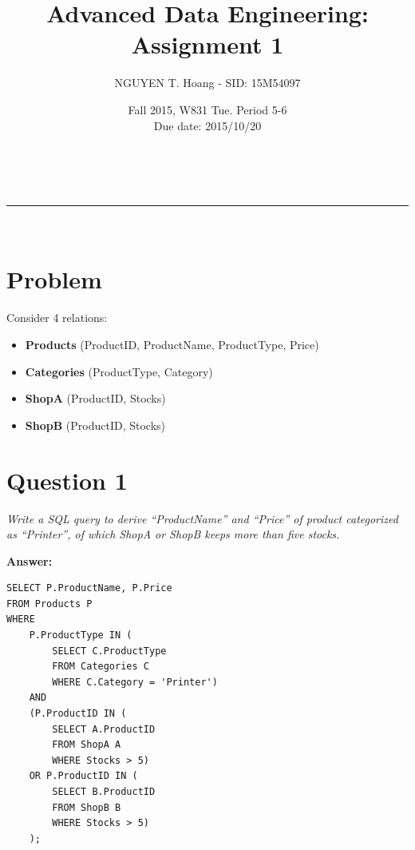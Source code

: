 \documentclass[a4paper,11pt]{article}
\makeatletter
\newcommand{\linia}{\rule{\linewidth}{0.5pt}}
\renewcommand{\maketitle}{
\begin{center}
\vspace{2ex}
{\huge \textsc{\@title}}
\vspace{1ex}
\\
\linia\\
\@author \hfill \@date
\vspace{4ex}
\end{center}
}
\makeatother
\begin{document}
\title{Advanced Data Engineering: Assignment 1}

\author{NGUYEN T. Hoang - SID: 15M54097}

\date{Fall 2015, W831 Tue. Period 5-6 \\ \hfill Due date: 2015/10/20}

\maketitle

\vfill

\section*{Problem}

Consider 4 relations:
\begin{itemize}
    \setlength{\itemsep}{0cm}
    \setlength{\parskip}{0cm}
    \item \textbf{Products} (ProductID, ProductName, ProductType, Price)
    \item \textbf{Categories} (ProductType, Category)
    \item \textbf{ShopA} (ProductID, Stocks)
    \item \textbf{ShopB} (ProductID, Stocks)
\end{itemize}
\vfill
\section*{Question 1}

\textit{Write a SQL query to derive ``ProductName'' and ``Price'' of product categorized as ``Printer'', of which ShopA or ShopB keeps more than five stocks.} 

\noindent
\textbf{Answer:} \\[-3em]

\begin{lstlisting}[label={list:first},caption=SQL query to get 'Printer' product with more than 5 stocks in ShopA or ShopB]
SELECT P.ProductName, P.Price
FROM Products P
WHERE 
    P.ProductType IN (
        SELECT C.ProductType
        FROM Categories C
        WHERE C.Category = 'Printer')
    AND 
    (P.ProductID IN (
        SELECT A.ProductID
        FROM ShopA A
        WHERE Stocks > 5)
    OR P.ProductID IN (
        SELECT B.ProductID
        FROM ShopB B
        WHERE Stocks > 5)
    );
\end{lstlisting}
\vfill
\pagebreak

\vspace*{3em}
\end{document}
